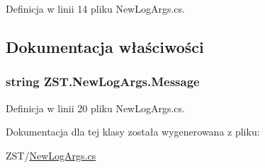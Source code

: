 Definicja w linii 14 pliku New\+Log\+Args.\+cs.



\subsection{Dokumentacja właściwości}
\hypertarget{class_z_s_t_1_1_new_log_args_aac5883e40720dabf36c5aff38900ae6b}{}
\subsubsection[{Message}]{\setlength{\rightskip}{0pt plus 5cm}string Z\+S\+T.\+New\+Log\+Args.\+Message\hspace{0.3cm}{\ttfamily [get]}}\label{class_z_s_t_1_1_new_log_args_aac5883e40720dabf36c5aff38900ae6b}


Definicja w linii 20 pliku New\+Log\+Args.\+cs.



Dokumentacja dla tej klasy została wygenerowana z pliku\+:\begin{DoxyCompactItemize}
\item 
Z\+S\+T/\hyperlink{_new_log_args_8cs}{New\+Log\+Args.\+cs}\end{DoxyCompactItemize}
